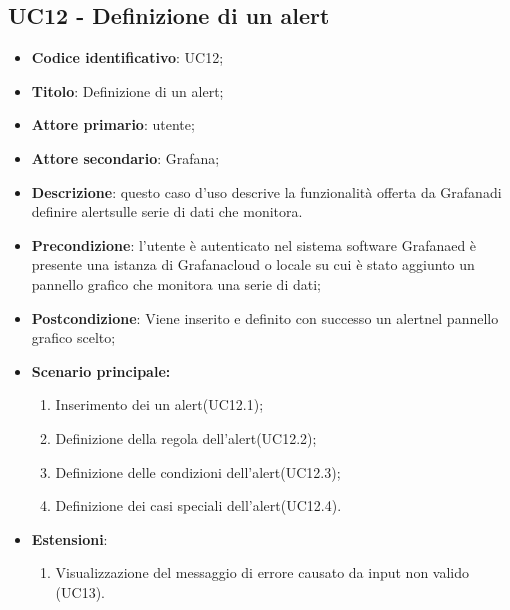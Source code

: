 \subsection{UC12 - Definizione di un alert}
\begin{itemize}
	\item \textbf{Codice identificativo}: UC12;
	\item \textbf{Titolo}: Definizione di un alert\glo;
	\item \textbf{Attore primario}: utente;
	\item \textbf{Attore secondario}: Grafana\glo;
	\item \textbf{Descrizione}: questo caso d'uso descrive la funzionalità offerta da Grafana\glosp di definire alert\glosp sulle serie di dati che monitora.
	\item \textbf{Precondizione}: l'utente è autenticato nel sistema software Grafana\glosp ed è presente una istanza di Grafana\glosp cloud o locale su cui è stato aggiunto un pannello grafico che monitora una serie di dati;
	\item \textbf{Postcondizione}: Viene inserito e definito con successo un alert\glosp nel pannello grafico scelto;
	\item \textbf{Scenario principale:} 
	\begin{enumerate}
		\item Inserimento dei un alert\glosp (UC12.1);
		\item Definizione della regola dell'alert\glosp (UC12.2);
		\item Definizione delle condizioni dell'alert\glosp(UC12.3);
		\item Definizione dei casi speciali dell'alert\glosp (UC12.4).
	\end{enumerate}

	\item \textbf{Estensioni}:	
	\begin{enumerate}
		\item Visualizzazione del messaggio di errore causato da input non valido (UC13).
	\end{enumerate}
\end{itemize}

